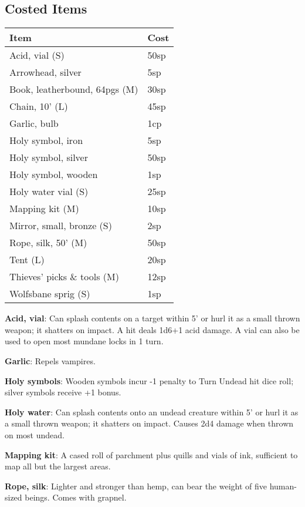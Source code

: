 \documentclass{article}
\begin{document}
\begin{multicols}{2}
\subsection{Costed Items}\label{costed-items}

\begin{longtable}[]{@{}ll@{}}
\toprule\noalign{}
Item & Cost \\
\midrule\noalign{}
\endhead
\bottomrule\noalign{}
\endlastfoot
Acid, vial (S) & 50sp \\
Arrowhead, silver & 5sp \\
Book, leatherbound, 64pgs (M) & 30sp \\
Chain, 10' (L) & 45sp \\
Garlic, bulb & 1cp \\
Holy symbol, iron & 5sp \\
Holy symbol, silver & 50sp \\
Holy symbol, wooden & 1sp \\
Holy water vial (S) & 25sp \\
Mapping kit (M) & 10sp \\
Mirror, small, bronze (S) & 2sp \\
Rope, silk, 50' (M) & 50sp \\
Tent (L) & 20sp \\
Thieves' picks \& tools (M) & 12sp \\
Wolfsbane sprig (S) & 1sp \\
\end{longtable}

\textbf{Acid, vial}: Can splash contents on a target within 5' or hurl
it as a small thrown weapon; it shatters on impact. A hit deals 1d6+1
acid damage. A vial can also be used to open most mundane locks in 1
turn.

\textbf{Garlic}: Repels vampires.

\textbf{Holy symbols}: Wooden symbols incur -1 penalty to Turn Undead
hit dice roll; silver symbols receive +1 bonus.

\textbf{Holy water}: Can splash contents onto an undead creature within
5' or hurl it as a small thrown weapon; it shatters on impact. Causes
2d4 damage when thrown on most undead.

\textbf{Mapping kit}: A cased roll of parchment plus quills and vials of
ink, sufficient to map all but the largest areas.

\textbf{Rope, silk}: Lighter and stronger than hemp, can bear the weight
of five human-sized beings. Comes with grapnel.


\end{multicols}
\end{document}
